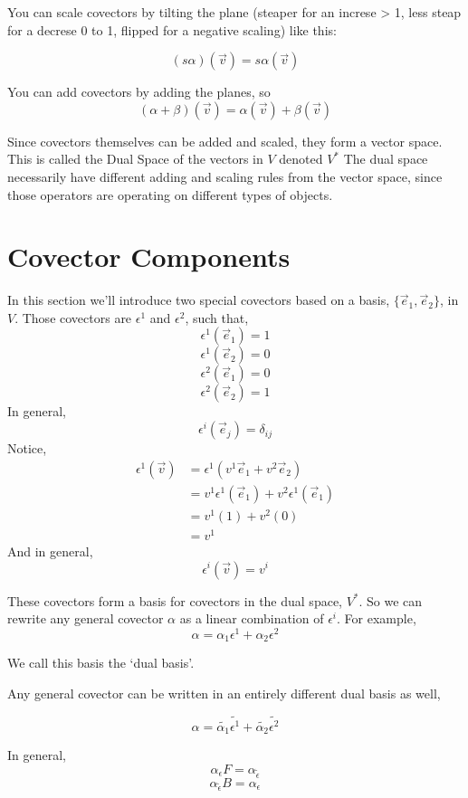 \documentclass[12pt]{book}
\theoremstyle{plain}
\theoremstyle{definition}
\theoremstyle{ppart}
\theoremstyle{case}
\theoremstyle{solution}
\begin{document}
You can scale covectors by tilting the plane (steaper for an increse > 1, less steap for a decrese 0 to 1, flipped for a negative scaling)
like this:

\[ (s \alpha)(\vec{v}) = s \alpha(\vec{v}) \]

You can add covectors by adding the planes, so
\[ (\alpha+\beta)(\vec{v}) = \alpha(\vec{v})+\beta(\vec{v}) \]

Since covectors themselves can be added and scaled, they form a vector space. This is called the Dual Space of the vectors in $V$ denoted $V^*$
The dual space necessarily have different adding and scaling rules from the vector space, since those operators are operating on different
types of objects.

\section{Covector Components}

In this section \cite{youtube:tensor5} we'll introduce two special covectors based on a basis, $\{\vec{e}_1, \vec{e}_2\}$, in $V$.
Those covectors are $\epsilon^1$ and $\epsilon^2$, such that,
\[ \epsilon^1(\vec{e}_1) = 1 \]
\[ \epsilon^1(\vec{e}_2) = 0 \]
\[ \epsilon^2(\vec{e}_1) = 0 \]
\[ \epsilon^2(\vec{e}_2) = 1 \]
In general,
\[ \epsilon^i(\vec{e}_j) = \delta_{ij} \]
Notice,
\begin{align*}
  \epsilon^1(\vec{v})
  &= \epsilon^1(v^1 \vec{e}_1 + v^2 \vec{e}_2) \\
  &= v^1 \epsilon^1(\vec{e}_1) + v^2 \epsilon^1(\vec{e}_1) \\
  &= v^1 (1) + v^2 (0) \\
  &= v^1
\end{align*}
And in general,
\[ \epsilon^i(\vec{v}) = v^i \]

These covectors form a basis for covectors in the dual space, $V^*$.
So we can rewrite any general covector $\alpha$ as a linear combination of $\epsilon^i$.
For example,
\[ \alpha = \alpha_1\epsilon^1 + \alpha_2 \epsilon^2 \]

We call this basis the `dual basis'.

Any general covector can be written in an entirely different dual basis as well,

\[ \alpha = \widetilde{\alpha_1} \widetilde{\epsilon^1} +  \widetilde{\alpha_2} \widetilde{\epsilon^2} \]

In general,
\label{change_covector_basis}
\[ \alpha_{\epsilon} F = \alpha_{\widetilde{\epsilon}} \]
\[ \alpha_{\widetilde{\epsilon}} B = \alpha_{\epsilon} \]
\end{document}
